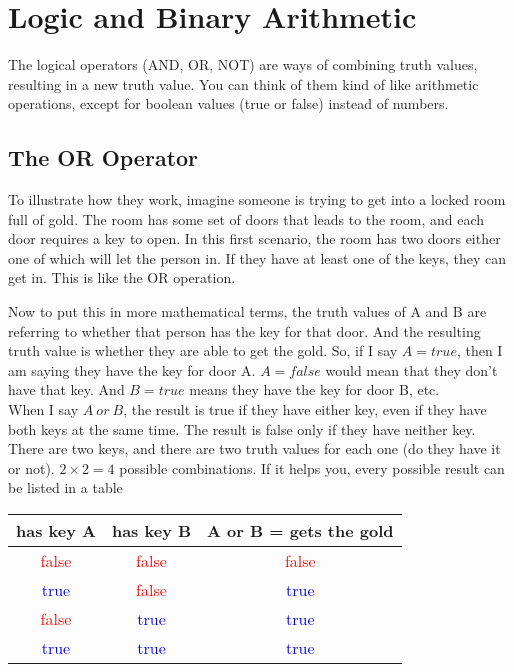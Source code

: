 \chapter{Logic and Binary Arithmetic}

The logical operators (AND, OR, NOT) are ways of combining truth values, resulting in a new truth value. You can think of them kind of like arithmetic operations, except for boolean values (true or false) instead of numbers.\\

\section{The OR Operator}

To illustrate how they work, imagine someone is trying to get into a locked room full of gold. The room has some set of doors that leads to the room, and each door requires a key to open. In this first scenario, the room has two doors either one of which will let the person in. If they have at least one of the keys, they can get in. This is like the OR operation.\\

\begin{center} \end{center}

Now to put this in more mathematical terms, the truth values of A and B are referring to whether that person has the key for that door. And the resulting truth value is whether they are able to get the gold. So, if I say \(A=true\), then I am saying they have the key for door A. \(A=false\) would mean that they don't have that key. And \(B=true\) means they have the key for door B, etc.\\

When I say \(A\: {or} \: B\), the result is true if they have either key, even if they have both keys at the same time. The result is false only if they have neither key. There are two keys, and there are two truth values for each one (do they have it or not). \(2 \times 2 = 4\) possible combinations. If it helps you, every possible result can be listed in a table\\

\begin{center}
	\begin{tabular}{c | c | c}
		has key A & has key B & A or B = gets the gold\\ \hline
		\textcolor{red}{false} & \textcolor{red}{false} & \textcolor{red}{false}\\ \hline
		\textcolor{blue}{true} & \textcolor{red}{false} & \textcolor{blue}{true} \\ \hline
		\textcolor{red}{false} & \textcolor{blue}{true} & \textcolor{blue}{true} \\ \hline
		\textcolor{blue}{true} & \textcolor{blue}{true} &\textcolor{blue} {true} \\ \hline
	\end{tabular}
\end{center}

